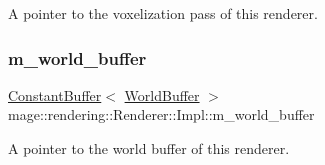 A pointer to the voxelization pass of this renderer. \hypertarget{classmage_1_1rendering_1_1_renderer_1_1_impl_ab108fbff123947defcc47f8cf53425e0}{}\label{classmage_1_1rendering_1_1_renderer_1_1_impl_ab108fbff123947defcc47f8cf53425e0} 
\subsubsection{\texorpdfstring{m\+\_\+world\+\_\+buffer}{m\_world\_buffer}}
{\footnotesize\ttfamily \hyperlink{classmage_1_1rendering_1_1_constant_buffer}{Constant\+Buffer}$<$ \hyperlink{structmage_1_1rendering_1_1_world_buffer}{World\+Buffer} $>$ mage\+::rendering\+::\+Renderer\+::\+Impl\+::m\+\_\+world\+\_\+buffer\hspace{0.3cm}{\ttfamily [private]}}

A pointer to the world buffer of this renderer. 